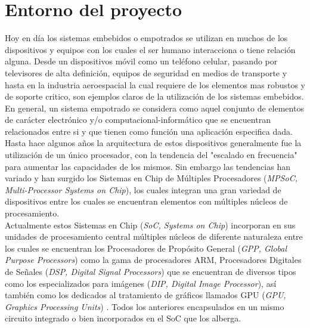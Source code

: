 
\chapter{Entorno del proyecto}
\label{chp:Entorno_del_proyecto}

Hoy en día los sistemas embebidos o empotrados se utilizan en muchos de los dispositivos
y equipos con los cuales el ser humano interacciona o tiene relación alguna. Desde un dispositivos
móvil como un teléfono celular, pasando por televisores de alta definición, equipos de seguridad
en medios de transporte y hasta en la industria aeroespacial la cual requiere de los elementos mas robustos
y de soporte critico, son ejemplos claros de la utilización de los sistemas embebidos.\\

En general, un sistema empotrado se considera como aquel conjunto de elementos de carácter electrónico y/o
computacional-informático que  se encuentran relacionados entre si y que tienen como función una aplicación 
especifica dada.\cite {LERTA} \cite{MK1} \\

Hasta hace algunos años la arquitectura de estos dispositivos generalmente fue la utilización de un único procesador, 
con la tendencia del "escalado en frecuencia" \cite{TAODES} para aumentar las capacidades de los mismos. Sin embargo
las tendencias han variado y han surgido los Sistemas en Chip de Múltiples Procesadores 
(\textit{MPSoC, Multi-Processor Systems on Chip}), los cuales integran una gran variedad de dispositivos entre los cuales
se encuentran elementos con múltiples núcleos de procesamiento.\\

Actualmente estos Sistemas en Chip (\textit{SoC, Systems on Chip}) incorporan en sus unidades de procesamiento central
múltiples núcleos de diferente naturaleza entre los cuales se encuentran los Procesadores de Propósito 
General (\textit{GPP, Global Purpose Processors}) como la gama de procesadores ARM, Procesadores Digitales de 
Señales (\textit{DSP, Digital Signal Processors}) que se encuentran de diversos tipos como los 
especializados para imágenes (\textit{DIP, Digital Image Processor}), así también como los dedicados al tratamiento de gráficos llamados 
GPU (\textit{GPU, Graphics Processing Units}) \cite{MK2}. Todos los anteriores encapsulados en un mismo circuito integrado o bien 
incorporados en el SoC que los alberga.\\

